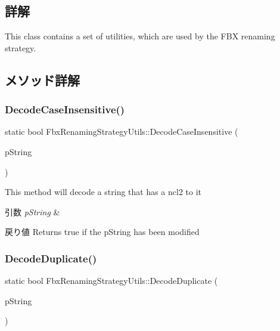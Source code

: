 \subsection{詳解}
This class contains a set of utilities, which are used by the F\+BX renaming strategy. 

\subsection{メソッド詳解}
\mbox{\label{class_fbx_renaming_strategy_utils_a9f252cd7a3b44f25e7bb421e11acc512}} 
\subsubsection{\texorpdfstring{Decode\+Case\+Insensitive()}{DecodeCaseInsensitive()}}
{\footnotesize\ttfamily static bool Fbx\+Renaming\+Strategy\+Utils\+::\+Decode\+Case\+Insensitive (\begin{DoxyParamCaption}\item[{\hyperlink{class_fbx_string}{Fbx\+String} \&}]{p\+String }\end{DoxyParamCaption})\hspace{0.3cm}{\ttfamily [static]}}

This method will decode a string that has a ncl2 to it 
\begin{DoxyParams}{引数}
{\em p\+String} & \\
\hline
\end{DoxyParams}
\begin{DoxyReturn}{戻り値}
Returns true if the p\+String has been modified 
\end{DoxyReturn}
\mbox{\label{class_fbx_renaming_strategy_utils_a52105ea9c53b3a5bdb064435b6027f7b}} 
\subsubsection{\texorpdfstring{Decode\+Duplicate()}{DecodeDuplicate()}}
{\footnotesize\ttfamily static bool Fbx\+Renaming\+Strategy\+Utils\+::\+Decode\+Duplicate (\begin{DoxyParamCaption}\item[{\hyperlink{class_fbx_string}{Fbx\+String} \&}]{p\+String }\end{DoxyParamCaption})\hspace{0.3cm}{\ttfamily [static]}}

